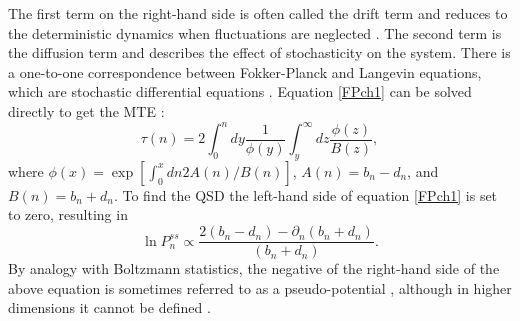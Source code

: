 The first term on the right-hand side is often called the drift term and reduces to the deterministic dynamics when fluctuations are neglected \cite{Gardiner2004a}. 
The second term is the diffusion term and describes the effect of stochasticity on the system. 
There is a one-to-one correspondence between Fokker-Planck and Langevin equations, which are stochastic differential equations \cite{Gardiner2004a}. 
Equation \ref{FPch1} can be solved directly to get the MTE \cite{Gardiner2004,Iyer-Biswas2015}: 
\begin{equation}
\tau(n) = 2\int_0^n dy \frac{1}{\phi(y)} \int_y^\infty dz \frac{\phi(z)}{B(z)},
\end{equation}
where $\phi(x) = \exp\left[\int_0^x dn 2 A(n)/B(n)\right]$, $A(n) = b_n - d_n$, and $B(n) = b_n + d_n$. 
To find the QSD the left-hand side of equation \ref{FPch1} is set to zero, resulting in \cite{Gardiner2004a}
\begin{equation}
\ln P_n^{ss} \propto \frac{2(b_n - d_n) - \partial_n(b_n + d_n)}{(b_n + d_n)}. 
\end{equation}
By analogy with Boltzmann statistics, the negative of the right-hand side of the above equation is sometimes referred to as a pseudo-potential \cite{Roozen1987,Grasman1996,Zhou2012,Yan2013}, although in higher dimensions it cannot be defined \cite{Zhou2012,Badali2019a}. %


